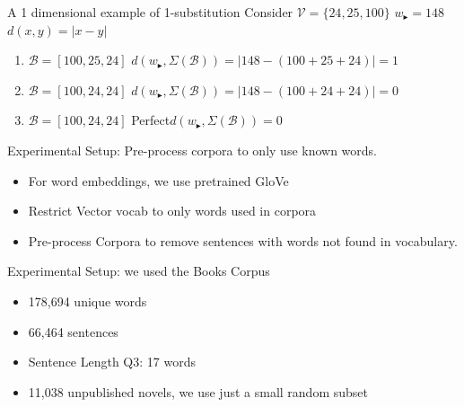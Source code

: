 \documentclass[]{beamer}
\newcommand{\V}{\mathcal{V}}
\newcommand{\B}{\mathcal{B}}
\newcommand{\s}{w_{\blacktriangleright}}
\begin{document}
\begin{frame}{A 1 dimensional example of 1-substitution}
	\vectorselectionproblemdefnalt
	\vfill
	Consider $\V=\{24,25,100\}$ \hfill $\s=148$ \hfill $d(x,y)=|x-y|$
	\begin{enumerate}
		\item<1-> $\B=[100,25,24]$ \hfill $d(\s,\Sigma(\B))=|148-(100+25+24)|=1$ 
		\item<2-> $\B=[100,24,24]$ \hfill $d(\s,\Sigma(\B))=|148-(100+24+24)|=0$ 
		\item<3-> $\B=[100,24,24]$ \hfill Perfect\hfill $d(\s,\Sigma(\B))=0$ 
	\end{enumerate}
	\vfill
	\vfill
\end{frame}


\begin{frame}{Experimental Setup: Pre-process corpora to only use known words.}
	\begin{itemize}
		\item<1-> For word embeddings, we use pretrained GloVe 
		\item<2-> Restrict Vector vocab to only words used in corpora
		\item<2-> Pre-process Corpora to remove sentences with words not found in vocabulary.
	\end{itemize}
\end{frame}

\begin{frame}{Experimental Setup: we used the Books Corpus}

	\begin{itemize}
		\item 178,694 unique words
		\item 66,464 sentences 
		\item Sentence Length Q3: 17 words
		\item 11,038 unpublished novels, we use just a small random subset
	\end{itemize}

\end{frame}
\end{document}
